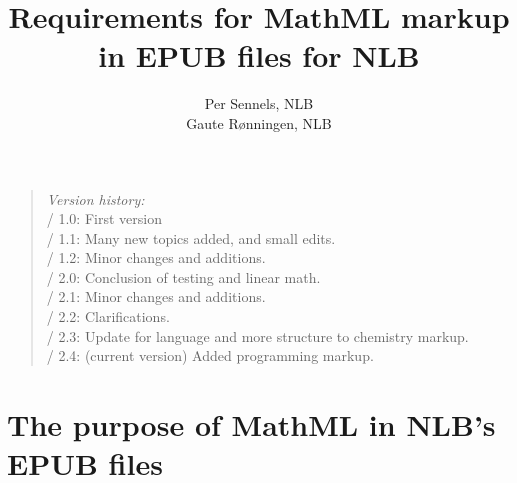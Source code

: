 \documentclass[english,a4paper,11pt]{article}
\title{Requirements for MathML markup\\ in EPUB files for NLB}
\author{Per Sennels, NLB\\Gaute Rønningen, NLB}
\begin{document}
	\bunntekst
	\thispagestyle{empty}
	\raggedright
	
	\maketitle
	\thispagestyle{empty}
	\vfill
	\begin{quote} {
		\bigskip
		\emph{Version history:}\\
		\textbullet{} / 1.0: First version\\
		\textbullet{} / 1.1: Many new topics added, and small edits.\\
		\textbullet{} / 1.2: Minor changes and additions.\\
		\textbullet{} / 2.0: Conclusion of testing and linear math.\\
        \textbullet{} / 2.1: Minor changes and additions.\\
        \textbullet{} / 2.2: Clarifications.\\
        \textbullet{} / 2.3: Update for language and more structure to chemistry markup.\\
        \textbullet{} / 2.4: (current version) Added programming markup.\\
        \bigskip
	}
	\end{quote}
	\vfill
	\pagebreak
	\tableofcontents
	\vfill
	\pagebreak

\section{The purpose of MathML in NLB's EPUB files}
\end{document}
